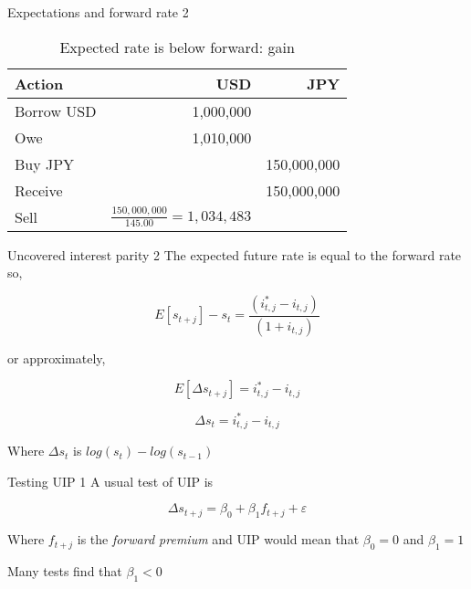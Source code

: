 \documentclass[14pt,xcolor=pdftex,dvipsnames,table]{beamer}\usepackage[]{graphicx}\usepackage[]{color}
\begin{document}
\begin{frame}{Expectations and forward rate 2}
\begin{table}[h!]
\begin{center}
\begin{tabular}{l r r}
\textbf{Action} & \textbf{USD} & \textbf{JPY}\\
\hline
Borrow USD & 1,000,000 & \\
Owe & 1,010,000&  \\
Buy JPY & & 150,000,000\\
Receive & & 150,000,000\\
Sell & $\frac{150,000,000}{145.00} = 1,034,483$ &
\end{tabular}
\end{center}
\caption{Expected rate is below forward: gain}
\label{tabref:cip3}
\end{table}
\end{frame}

\begin{frame}{Uncovered interest parity 2}
The expected future rate is equal to the forward rate so,
\begin{block}{}
\begin{equation}
E[s_{t+j}] - s_t = \frac{(i_{t, j}^* - i_{t, j})}{(1 + i_{t, j})}
\end{equation}
\end{block}
or approximately,
\begin{block}{}
\begin{equation}
E[\Delta s_{t+j}] = i_{t, j}^* - i_{t, j}
\end{equation}
\end{block}
\begin{block}{}
\begin{equation}
\Delta s_t = i_{t,j}^* - i_{t,j} 
\end{equation} 
\end{block}
Where $\Delta s_t$ is $log (s_t) - log (s_{t-1})$ 
\end{frame}

\begin{frame}{Testing UIP 1}
A usual test of UIP is 
\begin{block}{}
\begin{equation}
\label{eq:uip}
\Delta s_{t + j} = \beta_0 +\beta_1 f_{t+j} + \varepsilon
\end{equation} 
\end{block}
Where $f_{t+j}$ is the \emph{forward premium} and UIP would mean that $\beta_0 = 0$ and $\beta_1 = 1$
\begin{block}{}
Many tests find that $\beta_1 < 0$
\end{block}
\end{frame}
\end{document}
